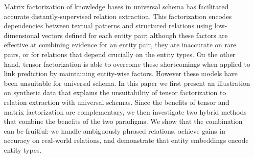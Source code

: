 Matrix factorization of knowledge bases in universal schema has facilitated accurate distantly-supervised relation extraction. This factorization encodes dependencies between textual patterns and structured relations using low-dimensional vectors defined for each entity pair; although these factors are effective at combining evidence for an entity pair, they are inaccurate on rare pairs, or for relations that depend crucially on the entity types. On the other hand, tensor factorization is able to overcome these shortcomings when applied to link prediction by maintaining entity-wise factors. However these models have been unsuitable for universal schema. In this paper we first present an illustration on synthetic data that explains the unsuitability of tensor factorization to relation extraction with universal schemas. Since the benefits of tensor and matrix factorization are complementary, we then investigate two hybrid methods that combine the benefits of the two paradigms. We show that the combination can be fruitful: we handle ambiguously phrased relations, achieve gains in accuracy on real-world relations, and demonstrate that entity embeddings encode entity types.
